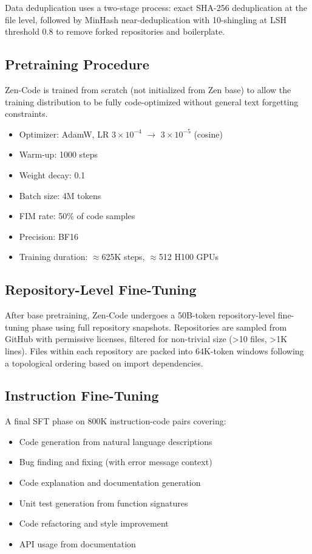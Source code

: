 \documentclass[11pt,a4paper]{article}
\begin{document}
Data deduplication uses a two-stage process: exact SHA-256 deduplication at the file level,
followed by MinHash near-deduplication with 10-shingling at LSH threshold 0.8 to remove
forked repositories and boilerplate.

\subsection{Pretraining Procedure}

Zen-Code is trained from scratch (not initialized from Zen base) to allow the training
distribution to be fully code-optimized without general text forgetting constraints.

\begin{itemize}
  \item Optimizer: AdamW, LR $3 \times 10^{-4}$ $\to$ $3 \times 10^{-5}$ (cosine)
  \item Warm-up: 1000 steps
  \item Weight decay: 0.1
  \item Batch size: 4M tokens
  \item FIM rate: 50\% of code samples
  \item Precision: BF16
  \item Training duration: $\approx$625K steps, $\approx$512 H100 GPUs
\end{itemize}

\subsection{Repository-Level Fine-Tuning}

After base pretraining, Zen-Code undergoes a 50B-token repository-level fine-tuning phase
using full repository snapshots. Repositories are sampled from GitHub with permissive licenses,
filtered for non-trivial size (>10 files, >1K lines). Files within each repository are packed
into 64K-token windows following a topological ordering based on import dependencies.

\subsection{Instruction Fine-Tuning}

A final SFT phase on 800K instruction-code pairs covering:

\begin{itemize}
  \item Code generation from natural language descriptions
  \item Bug finding and fixing (with error message context)
  \item Code explanation and documentation generation
  \item Unit test generation from function signatures
  \item Code refactoring and style improvement
  \item API usage from documentation
\end{itemize}
\end{document}
